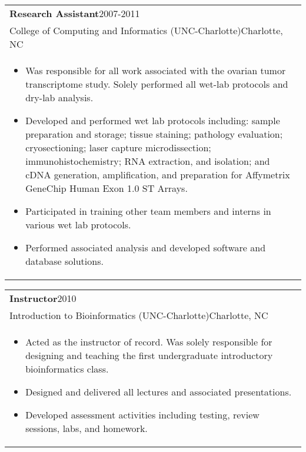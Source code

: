 \documentclass[12pt]{report}
\def\fullLength{6.5in}
\begin{document}
\begin{table}[!ht]
\begin{tabular}{p{\fullLength}}
\textbf{Research Assistant}\hfill 2007-2011\\
College of Computing and Informatics (UNC-Charlotte)\hfill Charlotte, NC\\
\vspace{-7.0mm}
\begin{itemize}\addtolength{\itemsep}{-0.5\baselineskip}
\item Was responsible for all work associated with the ovarian tumor transcriptome study. Solely performed all wet-lab protocols and dry-lab analysis.
\item Developed and performed wet lab protocols including: sample preparation and storage; tissue staining; pathology evaluation; cryosectioning; laser capture microdissection; immunohistochemistry; RNA extraction, and isolation; and cDNA generation, amplification, and preparation for Affymetrix GeneChip Human Exon 1.0 ST Arrays.
\item Participated in training other team members and interns in various wet lab protocols.
\item Performed associated analysis and developed software and database solutions.
\end{itemize}
\end{tabular}
\end{table}

\vspace{-5.0mm}

\begin{table}[!h]
\begin{tabular}{p{\fullLength}}
\textbf{Instructor}\hfill 2010\\
Introduction to Bioinformatics (UNC-Charlotte)\hfill Charlotte, NC\\
\vspace{-7.0mm}
\begin{itemize}\addtolength{\itemsep}{-0.5\baselineskip}
\item Acted as the instructor of record. Was solely responsible for designing and teaching the first undergraduate introductory bioinformatics class.
\item Designed and delivered all lectures and associated presentations.
\item Developed assessment activities including testing, review sessions, labs, and homework.
\end{itemize}
\end{tabular}
\end{table}
\end{document}
